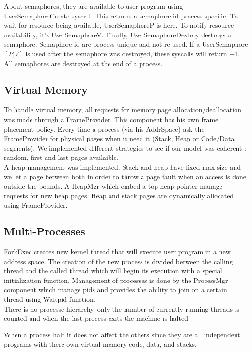About semaphores, they are available to user program using
UserSemaphoreCreate syscall. This returns a semaphore id process-specific. To
wait for resource being available, \textrm{UserSemaphoreP} is here. To notify resource
availability, it's\textrm{ UserSemaphoreV}. Finally,\textrm{ UserSemaphoreDestroy} destroys a
semaphore. Semaphore id are process-unique and not re-used. If a
UserSemaphore$[P|V]$ is used after the semaphore was destroyed, these syscalls
will return $-1$. All semaphores are destroyed at the end of a process.

\subsection{Virtual Memory}

To handle virtual memory, all requests for memory page allocation/deallocation
was made through a FrameProvider. This component has his own frame placement
policy. Every time a process (via his AddrSpace) ask the FrameProvider for
physical pages when it need it (Stack, Heap or Code/Data segments).
We implemented different strategies to see if our model was coherent : random,
first and last pages availaible.\\

A heap management was implemented. Stack and heap have fixed max size and
we let a page between both in order to throw a page fault when an access is done
outside the bounds. A HeapMgr which embed a top heap pointer manage requests for
new heap pages.
Heap and stack pages are dynamically allocated using FrameProvider.

\subsection{Multi-Processes}
ForkExec creates new kernel thread that will execute user program in a new
address space. The creation of the new process is divided between the calling
thread and the called thread which will begin its execution with a special
initialization function. Management of processes is done by the ProcessMgr
component which manage pids and provides the ability to join on a certain thread using
Waitpid function.\\

There is no processe hierarchy, only the number of currently running threads is
counted and when the last process exits the machine is halted.

When a process halt it does not affect the others since they are all independent
programs with there own virtual memory code, data, and stacks.\\

